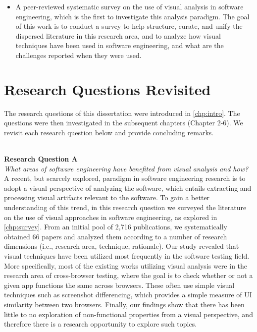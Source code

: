 \begin{itemize}
	\item A peer-reviewed systematic survey on the use of visual analysis in software engineering, 
	which is the first to investigate this analysis paradigm. The goal of this work is to conduct a survey to 
	help structure, curate, and unify the dispersed literature in this research area, and to analyze how visual techniques have been used in software engineering, and what are the challenges reported when they were used.  
\end{itemize}






\section{Research Questions Revisited}
The research questions of this dissertation were introduced in \autoref{chp:intro}. 
The questions were then investigated in the subsequent chapters (Chapter 2-6). 
We revisit each research question below and provide concluding remarks. 

\ \\ 
\textbf{Research Question A} \\
\textit{What areas of software engineering have benefited from visual analysis 
	and how?}
\\ 

A recent, but scarcely explored, paradigm in software engineering research is to 
adopt a visual perspective of analyzing the software, which entails extracting and processing 
visual artifacts relevant to the software. To gain a 
better understanding of this trend, in this research question we surveyed the 
literature on the use of visual approaches in software engineering, as explored in  \autoref{chp:survey}. 
From an initial pool of
2,716 publications, we systematically obtained 66 papers and analyzed them according to a number of research dimensions (i.e., research area, technique, rationale). Our study revealed that visual techniques have been utilized most frequently in the software testing field. More specifically, most of the existing works utilizing visual analysis were in the research area of cross-browser testing, where the goal is to check whether or not a given app functions the same across browsers. %
These often use simple visual techniques such as screenshot differencing, which provides a simple measure of UI similarity between two browsers. 
Finally, our findings show that there has been little to no exploration of non-functional properties from a visual perspective, and therefore there is a research opportunity to explore such topics. 



